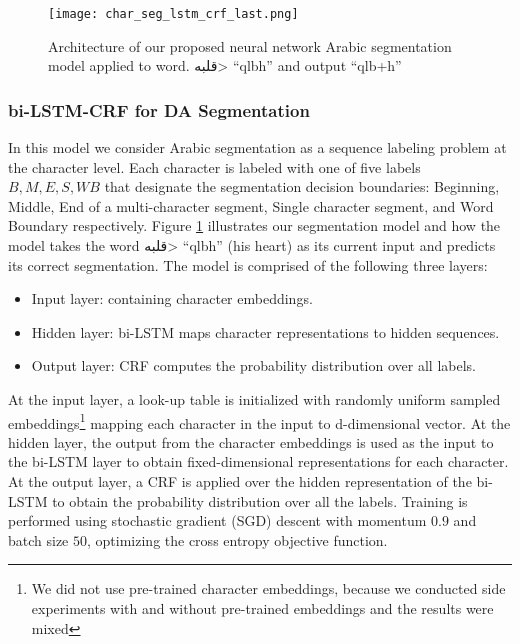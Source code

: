 \documentclass[11pt,letterpaper]{article}
\begin{document}
\begin{figure}[t]
\begin{center}
\texttt{[image: char\_seg\_lstm\_crf\_last.png]}
\end{center}
\caption{Architecture of our proposed neural network Arabic segmentation model applied to word. \<قلبه> ``qlbh''  and output ``qlb+h'' }
\label{fig:seg_archit}
\vspace{-1.5em}
\end{figure}

\subsubsection{bi-LSTM-CRF for DA Segmentation}
In this model we consider Arabic segmentation as a sequence labeling problem at the character level. Each character is labeled with one of five labels ${B, M, E, S, WB}$ that designate the segmentation decision boundaries: Beginning, Middle, End of a multi-character segment, Single character segment, and Word Boundary respectively.  Figure \ref{fig:seg_archit} illustrates our segmentation model and how the model takes the word \<قلبه> ``qlbh'' (his heart) as its current input and predicts its correct segmentation. The model is comprised of the following three layers:
\begin{itemize}[leftmargin=*]
\setlength\itemsep{-0.3em}
\item Input layer: containing character embeddings.
\item Hidden layer: bi-LSTM maps character representations to hidden sequences.
\item Output layer: CRF computes the probability distribution over all labels.
\end{itemize}

At the input layer, a look-up table is initialized with randomly uniform sampled embeddings\footnote{We did not use pre-trained character embeddings, because we conducted side experiments with and without pre-trained embeddings and the results were mixed} mapping each character in the input to d-dimensional vector. At the hidden layer, the output from the character embeddings is used as the input to the bi-LSTM layer to obtain fixed-dimensional representations for each character. At the output layer, a CRF is applied over the hidden representation of the bi-LSTM to obtain the probability distribution over all the labels.  Training is performed using stochastic gradient (SGD) descent with momentum $0.9$ and batch size $50$, optimizing the cross entropy objective function.
\end{document}
